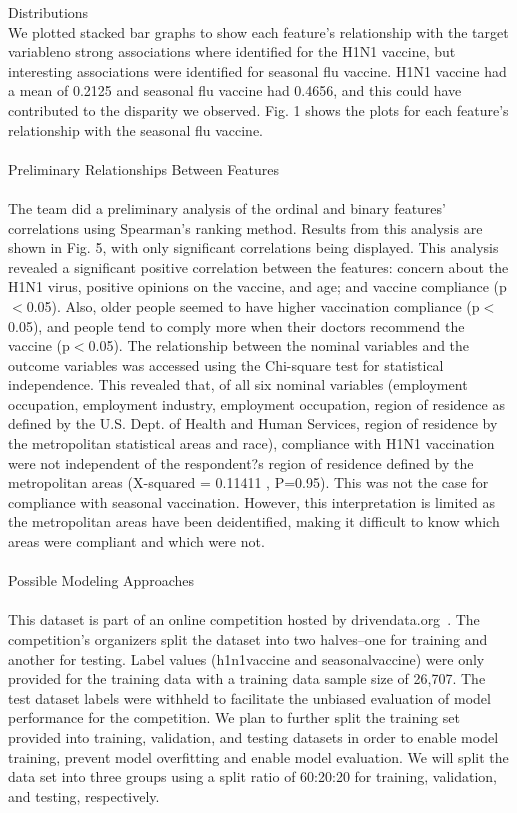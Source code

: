 \documentclass{IEEEtran}
\begin{document}
\begin{@twocolumnfalse}
\begin{center}
{}
\end{center}
{\huge Distributions}\\
We plotted stacked bar graphs to show each feature's relationship with the target variable\textemdash no strong associations where identified for the H1N1 vaccine, but interesting associations were identified for seasonal flu vaccine. H1N1 vaccine had a mean of 0.2125 and seasonal flu vaccine had 0.4656, and this could have contributed to the disparity we observed.  Fig. 1 shows the plots for each feature's relationship with the seasonal flu vaccine. \\\\
{\huge Preliminary Relationships Between Features}\\\\
The team did a preliminary analysis of the ordinal and binary features' correlations using Spearman's ranking method. Results from this analysis are shown in Fig. 5, with only significant correlations being displayed. This analysis revealed a significant positive correlation between the features: concern about the H1N1 virus, positive opinions on the vaccine, and age; and vaccine compliance (p$<$0.05). Also, older people seemed to have higher vaccination compliance (p$<$0.05), and people tend to comply more when their doctors recommend the vaccine (p$<$0.05). The relationship between the nominal variables and the outcome variables was accessed using the Chi-square test for statistical independence. This revealed that, of all six nominal variables (employment occupation, employment industry, employment occupation, region of residence as defined by the U.S. Dept. of Health and Human Services, region of residence by the metropolitan statistical areas and race), compliance with H1N1 vaccination were not independent of the respondent?s region of residence defined by the metropolitan areas (X-squared = 0.11411 , P=0.95). This was not the case for compliance with seasonal vaccination. However, this interpretation is limited as the metropolitan areas have been deidentified, making it difficult to know which areas were compliant and which were not.\\\\
{\huge Possible Modeling Approaches}\\\\
This dataset is part of an online competition hosted by drivendata.org~\cite{drivendata}. The competition's organizers split the dataset into two halves--one for training and another for testing. Label values (h1n1\textunderscore vaccine and seasonal\textunderscore vaccine) were only provided for the training data with a training data sample size of 26,707. The test dataset labels were withheld to facilitate the unbiased evaluation of model performance for the competition. We plan to further split the training set provided into training, validation, and testing datasets in order to enable model training, prevent model overfitting and enable model evaluation. We will split the data set into three groups using a split ratio of 60:20:20 for training, validation, and testing, respectively. 

\end{@twocolumnfalse}
\end{document}
